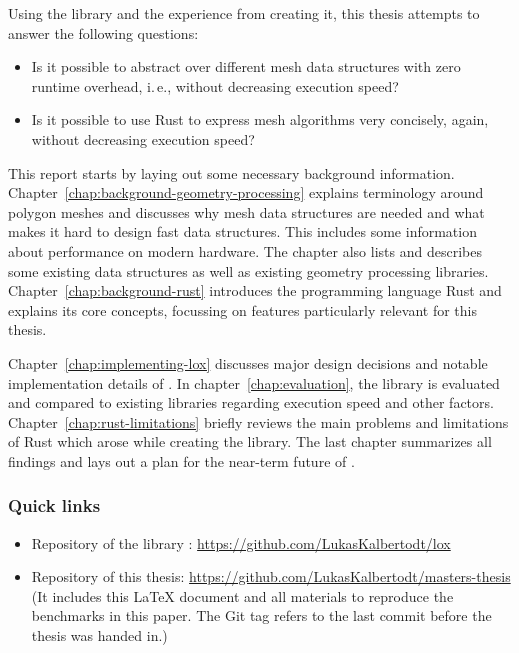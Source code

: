 \newpage

Using the library  and the experience from creating it, this thesis attempts to answer the following questions:

\begin{itemize}
  \item Is it possible to abstract over different mesh data structures with zero runtime overhead, i.\,e., without decreasing execution speed?
  \item Is it possible to use Rust to express mesh algorithms very concisely, again, without decreasing execution speed?
\end{itemize}


\vspace{1cm}

This report starts by laying out some necessary background information.
Chapter~\ref{chap:background-geometry-processing} explains terminology around polygon meshes and discusses why mesh data structures are needed and what makes it hard to design fast data structures.
This includes some information about performance on modern hardware.
The chapter also lists and describes some existing data structures as well as existing geometry processing libraries.
Chapter~\ref{chap:background-rust} introduces the programming language Rust and explains its core concepts, focussing on features particularly relevant for this thesis.

Chapter~\ref{chap:implementing-lox} discusses major design decisions and notable implementation details of .
In chapter~\ref{chap:evaluation}, the library is evaluated and compared to existing libraries regarding execution speed and other factors.
Chapter~\ref{chap:rust-limitations} briefly reviews the main problems and limitations of Rust which arose while creating the library.
The last chapter summarizes all findings and lays out a plan for the near-term future of .


\vfill

\subsubsection*{Quick links}
\begin{itemize}
  \item Repository of the library : \textcolor{link-blue}{\url{https://github.com/LukasKalbertodt/lox}}
  \item Repository of this thesis: \textcolor{link-blue}{\url{https://github.com/LukasKalbertodt/masters-thesis}}\\
  {\footnotesize (It includes this \LaTeX{} document and all materials to reproduce the benchmarks in this paper.
  The Git tag  refers to the last commit before the thesis was handed in.)}
\end{itemize}

\vspace{2cm}
